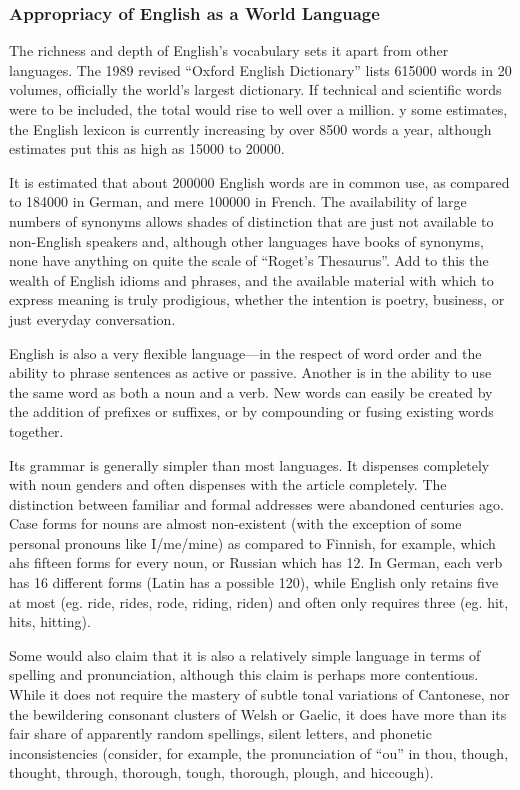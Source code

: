 \documentclass[../main.tex]{subfiles}
\begin{document}
        \subsubsection{Appropriacy of English as a World Language}
        The richness and depth of English's vocabulary sets it apart from other languages. The 1989 revised ``Oxford English Dictionary'' lists 615000 words in 20 volumes, officially the world's largest dictionary. If technical and scientific words were to be included, the total would rise to well over a million. y some estimates, the English lexicon is currently increasing by over 8500 words a year, although estimates put this as high as 15000 to 20000. \par
        It is estimated that about 200000 English words are in common use, as compared to 184000 in German, and mere 100000 in French. The availability of large numbers of synonyms allows shades of distinction that are just not available to non-English speakers and, although other languages have books of synonyms, none have anything on quite the scale of ``Roget's  Thesaurus''. Add to this the wealth of English idioms and phrases, and the available material with which to express meaning is truly prodigious, whether the intention is poetry, business, or just everyday conversation. \par 
        English is also a very flexible language---in the respect of word order and the ability to phrase sentences as active or passive. Another is in the ability to use the same word as both a noun and a verb. New words can easily be created by the addition of prefixes or suffixes, or by compounding or fusing existing words together. \par
        Its grammar is generally simpler than most languages. It dispenses completely with noun genders and often dispenses with the article completely. The distinction between familiar and formal addresses were abandoned centuries ago. Case forms for nouns are almost non-existent (with the exception of some personal pronouns like I/me/mine) as compared to Finnish, for example, which ahs fifteen forms for every noun, or Russian which has 12. In German, each verb has 16 different forms (Latin has a possible 120), while English only retains five at most (eg. ride, rides, rode, riding, riden) and often only requires three  (eg. hit, hits, hitting). \par
        Some would also claim that it is also a relatively simple language in terms of spelling and pronunciation, although this claim is perhaps more contentious. While it does not require the mastery of subtle tonal variations of Cantonese, nor the bewildering consonant clusters of Welsh or Gaelic, it does have more than its fair share of apparently random spellings, silent letters, and phonetic inconsistencies (consider, for example, the pronunciation of ``ou'' in thou, though, thought, through, thorough, tough, thorough, plough, and hiccough). \par
\end{document}
